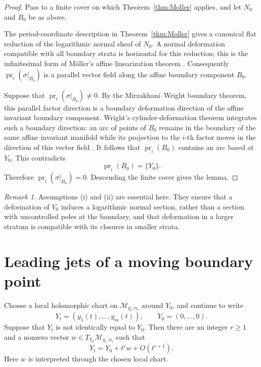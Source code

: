 \documentclass[11pt]{amsart}
\theoremstyle{definition}
\theoremstyle{remark}
\newtheorem{remark}[theorem]{Remark}
\newcommand{\M}{\mathcal M}
\begin{document}
\begin{proof}
Pass to a finite cover on which Theorem~\ref{thm:Moller} applies, and let
\(N_0\) and \(B_0\) be as above.

The period-coordinate description in Theorem~\ref{thm:Moller} gives a
canonical flat reduction of the logarithmic normal sheaf of \(N_0\). A
normal deformation compatible with all boundary strata is horizontal for
this reduction; this is the infinitesimal form of M\"oller's affine
linearization theorem \cite[\S4]{Moller2008}. Consequently
\(\operatorname{pr}_i(\sigma|_{B_0})\) is a parallel vector field along
the affine boundary component \(B_0\).

Suppose that \(\operatorname{pr}_i(\sigma|_{B_0})\neq0\). By the
Mirzakhani--Wright boundary theorem, this parallel factor direction is a
boundary deformation direction of the affine invariant boundary component.
Wright's cylinder-deformation theorem integrates such a boundary
direction: an arc of points of \(B_0\) remains in the boundary of the same
affine invariant manifold while its projection to the \(i\)-th factor
moves in the direction of this vector field
\cite{MW2017,Wright2015}. It follows that
\(\operatorname{pr}_i(B_0)\) contains an arc based at \(Y_0\). This
contradicts
\[
\operatorname{pr}_i(B_0)=\{Y_0\}.
\]
Therefore \(\operatorname{pr}_i(\sigma|_{B_0})=0\). Descending the finite
cover gives the lemma.
\end{proof}

\begin{remark}
Assumptions (i) and (ii) are essential here. They ensure that a
deformation of \(V_0\) induces a logarithmic normal section, rather than a
section with uncontrolled poles at the boundary, and that deformation in a
larger stratum is compatible with its closures in smaller strata.
\end{remark}

\section{Leading jets of a moving boundary point}

Choose a local holomorphic chart on \(\M_{g_i,n_i}\) around \(Y_0\), and
continue to write
\[
Y_t=(y_1(t),\ldots,y_m(t)),\qquad Y_0=(0,\ldots,0).
\]
Suppose that \(Y_t\) is not identically equal to \(Y_0\). Then there are
an integer \(r\geq1\) and a nonzero vector \(w\in T_{Y_0}\M_{g_i,n_i}\)
such that
\begin{equation}\label{eq:leading-term}
Y_t=Y_0+t^r w+O(t^{r+1}).
\end{equation}
Here \(w\) is interpreted through the chosen local chart.
\end{document}
